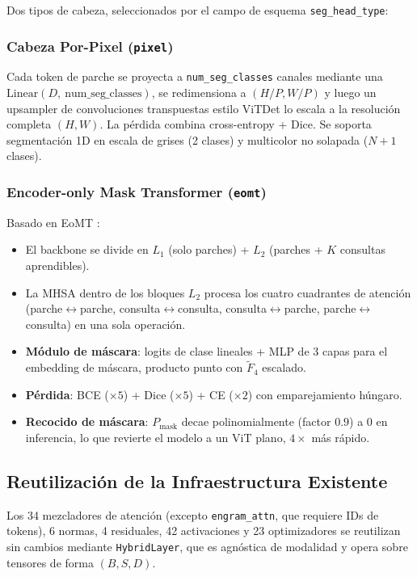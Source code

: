 Dos tipos de cabeza, seleccionados por el campo de esquema \texttt{seg\_head\_type}:

\subsubsection{Cabeza Por-Pixel (\texttt{pixel})}

Cada token de parche se proyecta a \texttt{num\_seg\_classes} canales mediante una $\text{Linear}(D,\allowbreak\ \text{num\_seg\_classes})$, se redimensiona a $(H/P, W/P)$ y luego un upsampler de convoluciones transpuestas estilo ViTDet lo escala a la resolución completa $(H, W)$. La pérdida combina cross-entropy + Dice. Se soporta segmentación 1D en escala de grises (2 clases) y multicolor no solapada ($N+1$ clases).

\subsubsection{Encoder-only Mask Transformer (\texttt{eomt})}

Basado en EoMT \citep{kerssies2025eomt}:
\begin{itemize}[leftmargin=*]
    \item El backbone se divide en $L_1$ (solo parches) + $L_2$ (parches + $K$ consultas aprendibles).
    \item La MHSA dentro de los bloques $L_2$ procesa los cuatro cuadrantes de atención (parche$\leftrightarrow$parche, consulta$\leftrightarrow$consulta, consulta$\leftrightarrow$parche, parche$\leftrightarrow$consulta) en una sola operación.
    \item \textbf{Módulo de máscara}: logits de clase lineales + MLP de 3 capas para el embedding de máscara, producto punto con $\tilde{F}_4$ escalado.
    \item \textbf{Pérdida}: BCE ($\times5$) + Dice ($\times5$) + CE ($\times2$) con emparejamiento húngaro.
    \item \textbf{Recocido de máscara}: $P_\text{mask}$ decae polinomialmente (factor $0.9$) a $0$ en inferencia, lo que revierte el modelo a un ViT plano, $4\times$ más rápido.
\end{itemize}

\subsection{Reutilización de la Infraestructura Existente}

Los 34 mezcladores de atención (excepto \texttt{engram\_attn}, que requiere IDs de tokens), 6 normas, 4 residuales, 42 activaciones y 23 optimizadores se reutilizan sin cambios mediante \texttt{HybridLayer}, que es agnóstica de modalidad y opera sobre tensores de forma $(B, S, D)$.

